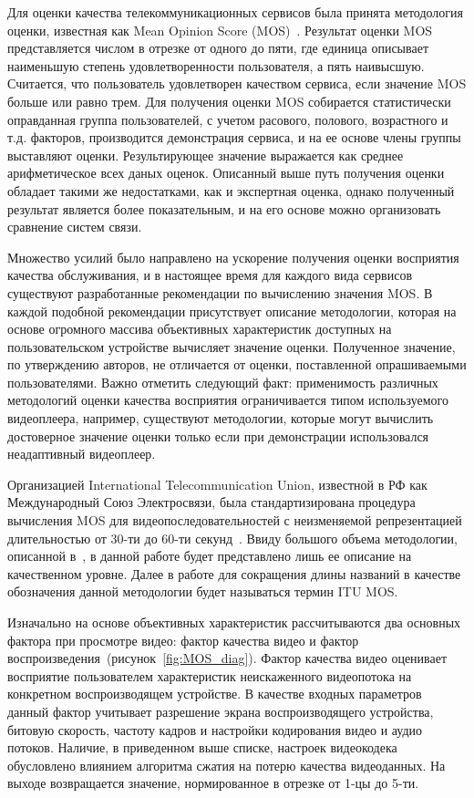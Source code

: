 Для оценки качества телекоммуникационных сервисов была принята методология оценки, известная как Mean Opinion Score (MOS)~\cite{MOS_termin}. Результат оценки MOS представляется числом в отрезке от одного до пяти, где единица описывает наименьшую степень удовлетворенности пользователя, а пять наивысшую. Считается, что пользователь удовлетворен качеством сервиса, если значение MOS больше или равно трем. Для получения оценки MOS собирается статистически оправданная группа пользователей, с учетом расового, полового, возрастного и т.д. факторов, производится демонстрация сервиса, и на ее основе члены группы выставляют оценки. Результирующее значение выражается как среднее арифметическое всех даных оценок. Описанный выше путь получения оценки обладает такими же недостатками, как и экспертная оценка, однако полученный результат является более показательным, и на его основе можно организовать сравнение систем связи.

Множество усилий было направлено на ускорение получения оценки восприятия качества обслуживания, и в настоящее время для каждого вида сервисов существуют разработанные рекомендации по вычислению значения MOS. В каждой подобной рекомендации присутствует описание методологии, которая на основе огромного массива объективных характеристик доступных на пользовательском устройстве вычисляет значение оценки. Полученное значение, по утверждению авторов, не отличается от оценки, поставленной опрашиваемыми пользователями. Важно отметить следующий факт: применимость различных методологий оценки качества восприятия ограничивается типом используемого видеоплеера, например, существуют методологии, которые могут вычислить достоверное значение оценки только если при демонстрации использовался неадаптивный видеоплеер.

Организацией International Telecommunication Union, известной в РФ как Международный Союз Электросвязи, была стандартизирована процедура вычисления MOS для видеопоследовательностей с неизменяемой репрезентацией длительностью от 30-ти до 60-ти секунд~\cite{VIDEO_MOS}. Ввиду большого объема методологии, описанной в~\cite{VIDEO_MOS}, в данной работе будет представлено лишь ее описание на качественном уровне. Далее в работе для сокращения длины названий в качестве обозначения данной методологии будет называться термин ITU MOS.

Изначально на основе объективных характеристик рассчитываются два основных фактора при просмотре видео:
фактор качества видео и фактор воспроизведения~(рисунок~\ref{fig:MOS_diag}). Фактор качества видео оценивает восприятие пользователем характеристик неискаженного видеопотока на конкретном воспроизводящем устройстве. В качестве входных параметров данный фактор учитывает разрешение экрана воспроизводящего устройства, битовую скорость, частоту кадров и настройки кодирования видео и аудио потоков. Наличие, в приведенном выше списке, настроек видеокодека обусловлено влиянием алгоритма сжатия на потерю качества видеоданных. На выходе возвращается значение, нормированное в отрезке от 1-цы до 5-ти.

